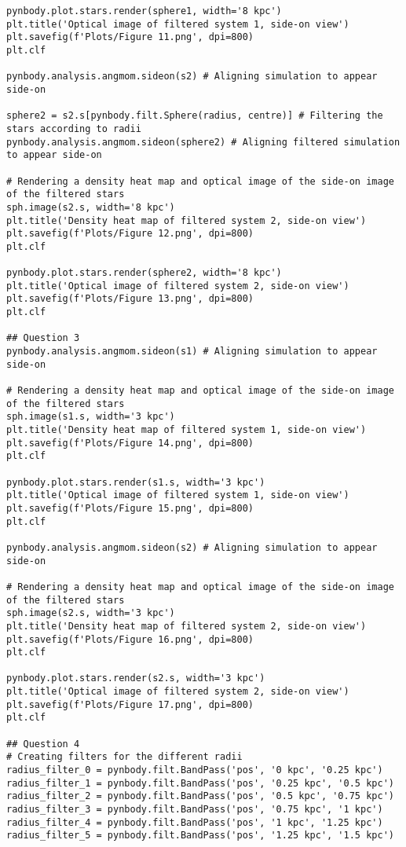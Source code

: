 \documentclass[12pt, a4paper]{article}
\begin{document}
\begin{lstlisting}[language=iPython]
pynbody.plot.stars.render(sphere1, width='8 kpc') 
plt.title('Optical image of filtered system 1, side-on view')
plt.savefig(f'Plots/Figure 11.png', dpi=800)
plt.clf

pynbody.analysis.angmom.sideon(s2) # Aligning simulation to appear side-on

sphere2 = s2.s[pynbody.filt.Sphere(radius, centre)] # Filtering the stars according to radii
pynbody.analysis.angmom.sideon(sphere2) # Aligning filtered simulation to appear side-on

# Rendering a density heat map and optical image of the side-on image of the filtered stars
sph.image(s2.s, width='8 kpc')
plt.title('Density heat map of filtered system 2, side-on view')
plt.savefig(f'Plots/Figure 12.png', dpi=800)
plt.clf

pynbody.plot.stars.render(sphere2, width='8 kpc')
plt.title('Optical image of filtered system 2, side-on view')
plt.savefig(f'Plots/Figure 13.png', dpi=800)
plt.clf

## Question 3
pynbody.analysis.angmom.sideon(s1) # Aligning simulation to appear side-on

# Rendering a density heat map and optical image of the side-on image of the filtered stars
sph.image(s1.s, width='3 kpc')
plt.title('Density heat map of filtered system 1, side-on view')
plt.savefig(f'Plots/Figure 14.png', dpi=800)
plt.clf

pynbody.plot.stars.render(s1.s, width='3 kpc')
plt.title('Optical image of filtered system 1, side-on view')
plt.savefig(f'Plots/Figure 15.png', dpi=800)
plt.clf

pynbody.analysis.angmom.sideon(s2) # Aligning simulation to appear side-on

# Rendering a density heat map and optical image of the side-on image of the filtered stars
sph.image(s2.s, width='3 kpc')
plt.title('Density heat map of filtered system 2, side-on view')
plt.savefig(f'Plots/Figure 16.png', dpi=800)
plt.clf

pynbody.plot.stars.render(s2.s, width='3 kpc')
plt.title('Optical image of filtered system 2, side-on view')
plt.savefig(f'Plots/Figure 17.png', dpi=800)
plt.clf

## Question 4
# Creating filters for the different radii
radius_filter_0 = pynbody.filt.BandPass('pos', '0 kpc', '0.25 kpc')
radius_filter_1 = pynbody.filt.BandPass('pos', '0.25 kpc', '0.5 kpc')
radius_filter_2 = pynbody.filt.BandPass('pos', '0.5 kpc', '0.75 kpc')
radius_filter_3 = pynbody.filt.BandPass('pos', '0.75 kpc', '1 kpc')
radius_filter_4 = pynbody.filt.BandPass('pos', '1 kpc', '1.25 kpc')
radius_filter_5 = pynbody.filt.BandPass('pos', '1.25 kpc', '1.5 kpc')


\end{lstlisting}
\end{document}
